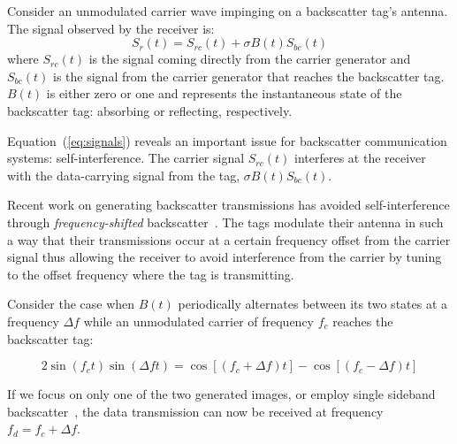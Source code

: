 Consider an unmodulated carrier wave impinging on a backscatter tag's
antenna. The signal observed by the receiver is:
\begin{equation}
				S_r(t) = S_{rc}(t) + \sigma B(t)S_{bc}(t)
				\label{eq:signals}
\end{equation}
where $S_{rc}(t)$ is the signal coming directly from the carrier
generator and $S_{bc}(t)$ is the signal from the carrier generator that
reaches the backscatter tag. $B(t)$ is either zero or one and represents
the instantaneous state of the backscatter tag: absorbing or reflecting,
respectively.

Equation~(\ref{eq:signals}) reveals an important issue for backscatter
communication systems: self-interference. The carrier signal $S_{rc}(t)$
interferes at the receiver with the data-carrying signal from the tag,
$\sigma B(t)S_{bc}(t)$. 

Recent work on generating backscatter transmissions has avoided
self-interference through \textit{frequency-shifted}
backscatter~\cite{kellogg_passive_2016,wang_fm_2017,varshney2016lorea}.
The tags modulate their antenna in such a way that their transmissions
occur at a certain frequency offset from the carrier signal thus
allowing the receiver to avoid interference from the carrier by tuning
to the offset frequency where the tag is transmitting.

Consider the case when $B(t)$ periodically
alternates between its two states at a frequency $\Delta f$ while an
unmodulated carrier of frequency $f_c$ reaches the backscatter tag:

\begin{equation}
    2\sin(f_c t) \sin(\Delta f t) = \cos[(f_c + \Delta f)t] - \cos[(f_c - \Delta f) t]
    \label{eq:mixing}
\end{equation}

If we focus on only one of the two generated images, or employ single
sideband backscatter~\cite{interscatter}, the data transmission can now
be received at frequency $f_d = f_c + \Delta f$.


